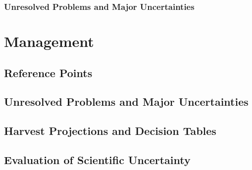 \documentclass[11pt,
  english,
  a4paper,
]{article}
\begin{document}

\hypertarget{unresolved-problems-and-major-uncertainties-1}{%
\subsubsection{Unresolved Problems and Major Uncertainties}\label{unresolved-problems-and-major-uncertainties-1}}

\leavevmode\tagmcend\tagstructend


\hypertarget{management}{%
\section{Management}\label{management}}

\leavevmode\tagmcend\tagstructend


\hypertarget{reference-points-2}{%
\subsection{Reference Points}\label{reference-points-2}}

\leavevmode\tagmcend\tagstructend


\hypertarget{unresolved-problems-and-major-uncertainties-2}{%
\subsection{Unresolved Problems and Major Uncertainties}\label{unresolved-problems-and-major-uncertainties-2}}

\leavevmode\tagmcend\tagstructend


\hypertarget{harvest-projections-and-decision-tables}{%
\subsection{Harvest Projections and Decision Tables}\label{harvest-projections-and-decision-tables}}

\leavevmode\tagmcend\tagstructend


\hypertarget{evaluation-of-scientific-uncertainty}{%
\subsection{Evaluation of Scientific Uncertainty}\label{evaluation-of-scientific-uncertainty}}
\end{document}
